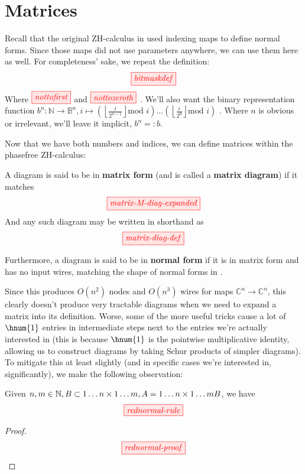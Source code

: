 \section{Matrices}\label{sec:matrices}
Recall that the original ZH-calculus in \cite{backens2018zhcalculus} used
indexing maps to define normal forms.  Since those maps did not use parameters
anywhere, we can use them here as well.  For completeness' sake, we repeat the
definition:
$$\tikzfig{bitmaskdef}$$
Where $\tikzfig{nottofirst}$ and $\tikzfig{nottozeroth}$ . We'll also want the
binary representation function 
$b^n : \mathbb{N} \rightarrow \mathbb{B}^n, i \mapsto \left( \left \lfloor
\frac{i}{2^{n-1}}\right \rfloor \text{mod } i \right) \ldots \left( \left \lfloor
\frac{i}{2^{0}}\right \rfloor \text{mod } i \right)$ . Where $n$ is obvious or
irrelevant, we'll leave it implicit, $b^n =: b$.

Now that we have both numbers and indices, we can define matrices within the
phasefree ZH-calculus:
\begin{definition}
    A diagram is said to be in \textbf{matrix form} (and is called a
    \textbf{matrix diagram}) if it matches
    $$\tikzfig{matrix-M-diag-expanded}$$
    And any such diagram may be written in shorthand as 
    $$\tikzfig{matrix-diag-def}$$

    Furthermore, a diagram is said to be in \textbf{normal form} if it is in
    matrix form and has no input wires, matching the shape of normal forms in
    \cite{backens2018zhcalculus}.
\end{definition}

Since this produces $O(n^2)$ nodes and $O(n^3)$ wires for maps $\mathbb{C}^n
\rightarrow \mathbb{C}^n$, this clearly doesn't produce very tractable diagrams
when we need to expand a matrix into its definition. Worse, some of the more
useful tricks cause a lot of $\hnum{1}$ entries in intermediate steps next to
the entries we're actually interested in (this is because $\hnum{1}$ is the
pointwise multiplicative identity, allowing us to construct diagrams by taking
Schur products of simpler diagrams). To mitigate this at least slightly (and in
specific cases we're interested in, significantly), we make the following
observation: 
\begin{lemma}
    Given $n,m \in \mathbb{N}, B \subset {1 \ldots n} \times {1 \ldots m}, A =
    {1 \ldots n} \times {1 \ldots m}\\B$, we have 
    $$\tikzfig{rednormal-rule}$$
\end{lemma}
\begin{proof}
    $$\tikzfig{rednormal-proof}$$
\end{proof}

